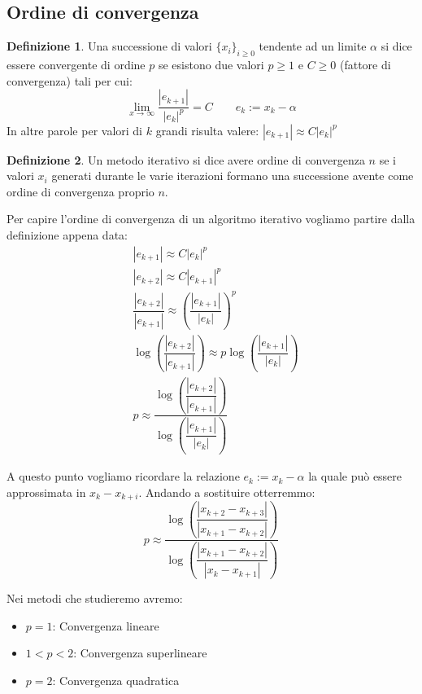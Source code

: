 \documentclass[12pt, a4paper]{book}
\theoremstyle{definition}
\newtheorem{defn}{Definizione}[section]
\begin{document}
\subsection{Ordine di convergenza}
\begin{flushleft}

\begin{defn}
	Una successione di valori $\{x_{i}\}_{i \geq 0}$ tendente ad un limite $\alpha$ si dice essere convergente di ordine $p$ se esistono due valori $p \geq 1$ e $C \geq 0$ (fattore di convergenza) tali per cui: 
	\[
		\lim_{x \to \infty} \dfrac{|e_{k+1}|}{|e_{k}|^{p}} = C \quad \quad e_{k}:= x_{k} - \alpha
	\]	
	In altre parole per valori di $k$ grandi risulta valere: $|e_{k+1}| \approx C|e_{k}|^{p}$
\end{defn}

\begin{defn}
	Un metodo iterativo si dice avere ordine di convergenza $n$ se i valori $x_{i}$ generati durante le varie iterazioni formano una successione avente come ordine di convergenza proprio $n$. 
\end{defn}

Per capire l'ordine di convergenza di un algoritmo iterativo vogliamo partire dalla definizione appena data:
\begin{equation}
	\begin{split}
		& |e_{k+1}| \approx C|e_{k}|^{p} \\
		& |e_{k+2}| \approx C|e_{k+1}|^{p} \\
		& \dfrac{|e_{k+2}|}{|e_{k+1}|} \approx \left(\dfrac{|e_{k+1}|}{|e_{k}|} \right) ^ {p} \\
		& \log \left(\dfrac{|e_{k+2}|}{|e_{k+1}|} \right) \approx p \log  \left(\dfrac{|e_{k+1}|}{|e_{k}|} \right) \\
		& p \approx \dfrac{\log \left(\dfrac{|e_{k+2}|}{|e_{k+1}|} \right)}{\log  \left(\dfrac{|e_{k+1}|}{|e_{k}|} \right)}
	\end{split}
\end{equation}

A questo punto vogliamo ricordare la relazione $e_{k}:= x_{k} - \alpha$ la quale può essere approssimata in $x_{k} - x_{k+i}$. Andando a sostituire otterremmo: 
\[ 
	p \approx \dfrac{\log \left(\dfrac{|x_{k+2} - x_{k+3} |}{|x_{k+1} - x_{k+2}|} \right)}{\log  \left(\dfrac{|x_{k+1} - x_{k+2}|}{|x_{k} -x_{k+1}|} \right)}
\]

Nei metodi che studieremo avremo:
\begin{itemize}
	\item $p = 1$: Convergenza lineare
	\item $ 1 < p < 2$: Convergenza superlineare
	\item $p = 2$: Convergenza quadratica
\end{itemize}


\end{flushleft}
\end{document}
